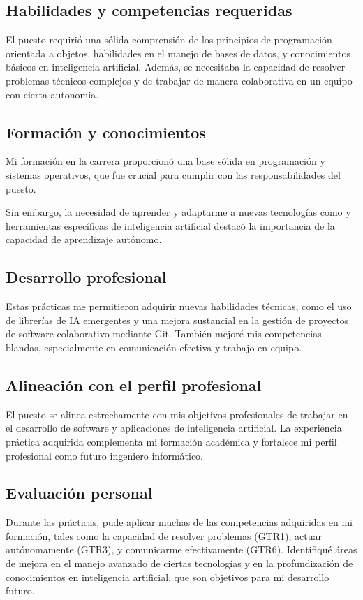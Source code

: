 \subsection{Habilidades y competencias requeridas}
El puesto requirió una sólida comprensión de los principios de programación orientada a objetos, habilidades en el manejo de bases de datos, y conocimientos básicos en inteligencia artificial. Además, se necesitaba la capacidad de resolver problemas técnicos complejos y de trabajar de manera colaborativa en un equipo con cierta autonomía.

\subsection{Formación y conocimientos}
Mi formación en la carrera proporcionó una base sólida en programación y sistemas operativos, que fue crucial para cumplir con las responsabilidades del puesto. 

Sin embargo, la necesidad de aprender y adaptarme a nuevas tecnologías como \href{https://dotnet.microsoft.com/es-es/languages/csharp}{} y herramientas específicas de inteligencia artificial destacó la importancia de la capacidad de aprendizaje autónomo.

\subsection{Desarrollo profesional}
Estas prácticas me permitieron adquirir nuevas habilidades técnicas, como el uso de librerías de IA emergentes y una mejora sustancial en la gestión de proyectos de software colaborativo mediante Git. También mejoré mis competencias blandas, especialmente en comunicación efectiva y trabajo en equipo.

\subsection{Alineación con el perfil profesional}
El puesto se alinea estrechamente con mis objetivos profesionales de trabajar en el desarrollo de software y aplicaciones de inteligencia artificial. La experiencia práctica adquirida complementa mi formación académica y fortalece mi perfil profesional como futuro ingeniero informático.

\subsection{Evaluación personal}
Durante las prácticas, pude aplicar muchas de las competencias adquiridas en mi formación, tales como la capacidad de resolver problemas (GTR1), actuar autónomamente (GTR3), y comunicarme efectivamente (GTR6). Identifiqué áreas de mejora en el manejo avanzado de ciertas tecnologías y en la profundización de conocimientos en inteligencia artificial, que son objetivos para mi desarrollo futuro.


